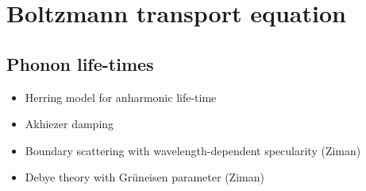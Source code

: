 \section{Boltzmann transport equation}

\subsection{Phonon life-times}
\begin{itemize}
 \item Herring model for anharmonic life-time
 \item Akhiezer damping
 \item Boundary scattering with wavelength-dependent specularity (Ziman)
 \item Debye theory with Gr\"uneisen parameter (Ziman)
\end{itemize}
